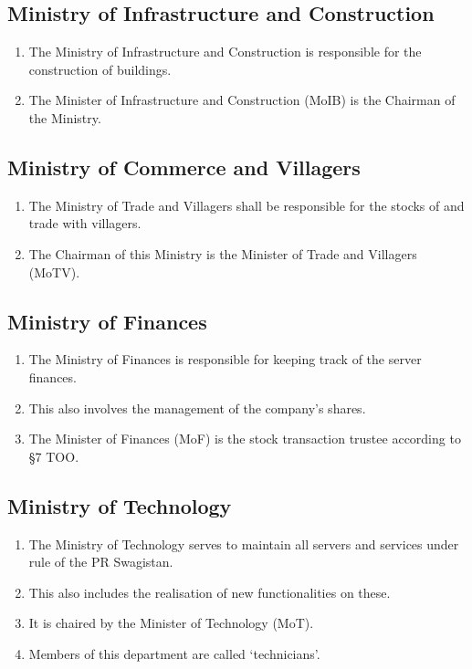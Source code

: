 \documentclass{article}
\begin{document}
\subsection{Ministry of Infrastructure and Construction}
\begin{enumerate}[(1)]
    \item The Ministry of Infrastructure and Construction is responsible for the construction of buildings.
    \item The Minister of Infrastructure and Construction (MoIB) is the Chairman of the Ministry.
\end{enumerate}

\subsection{Ministry of Commerce and Villagers}
\begin{enumerate}[(1)]
    \item The Ministry of Trade and Villagers shall be responsible for the stocks of and trade with villagers.
    \item The Chairman of this Ministry is the Minister of Trade and Villagers (MoTV).
\end{enumerate}

\subsection{Ministry of Finances}
\begin{enumerate}[(1)]
	\item The Ministry of Finances is responsible for keeping track of the server finances.
	\item This also involves the management of the company's shares.
	\item The Minister of Finances (MoF) is the stock transaction trustee according to §7 TOO.\@
\end{enumerate}

\subsection{Ministry of Technology}
\begin{enumerate}[(1)]
	\item The Ministry of Technology serves to maintain all servers and services under rule of the PR Swagistan.
	\item This also includes the realisation of new functionalities on these.
	\item It is chaired by the Minister of Technology (MoT).
	\item Members of this department are called `technicians'.
\end{enumerate}
\end{document}
